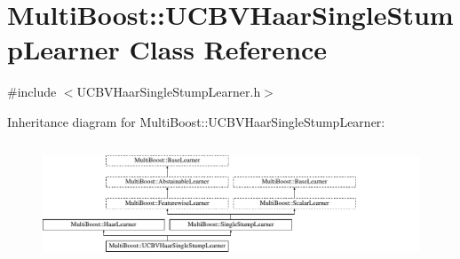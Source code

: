 \hypertarget{classMultiBoost_1_1UCBVHaarSingleStumpLearner}{
\section{MultiBoost::UCBVHaarSingleStumpLearner Class Reference}
\label{classMultiBoost_1_1UCBVHaarSingleStumpLearner}
}


{\ttfamily \#include $<$UCBVHaarSingleStumpLearner.h$>$}

Inheritance diagram for MultiBoost::UCBVHaarSingleStumpLearner:\begin{figure}[H]
\begin{center}
\leavevmode
\includegraphics[height=3.589744cm]{classMultiBoost_1_1UCBVHaarSingleStumpLearner}
\end{center}
\end{figure}

